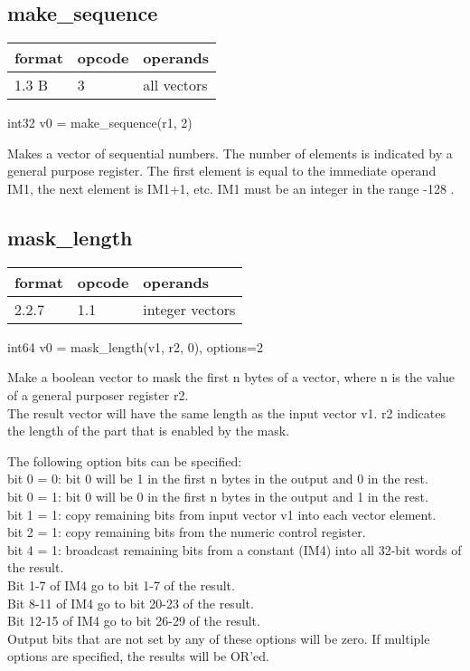 \documentclass[forwardcom.tex]{subfiles}
\begin{document}
\subsection{make\_sequence}
\label{table:makeSequenceInstruction}
\begin{tabular}{|p{12mm}|p{15mm}|p{100mm}|}
\hline
\bfseries format & \bfseries opcode & \bfseries operands \\ \hline
1.3 B &  3 & all vectors \\ \hline
\end{tabular}
\vv

int32 v0 = make\_sequence(r1, 2)
\vv

Makes a vector of sequential numbers. The number of elements is indicated by a general purpose register. 
The first element is equal to the immediate operand IM1, the next element is IM1+1, etc. IM1 must be an integer in the range -128 .
\vv


\subsection{mask\_length}
\label{table:maskLengthInstruction}
\begin{tabular}{|p{12mm}|p{15mm}|p{100mm}|}
\hline
\bfseries format & \bfseries opcode & \bfseries operands \\ \hline
2.2.7 & 1.1 & integer vectors \\ \hline
\end{tabular}
\vv

int64 v0 = mask\_length(v1, r2, 0), options=2
\vv

Make a boolean vector to mask the first n bytes of a vector, where n is the value of a general purposer register r2. \\
The result vector will have the same length as the input vector v1. r2 indicates the length of the part that is enabled by the mask. 
\vv

The following option bits can be specified: \\
bit 0 = 0: bit 0 will be 1 in the first n bytes in the output and 0 in the rest. \\
bit 0 = 1: bit 0 will be 0 in the first n bytes in the output and 1 in the rest. \\
bit 1 = 1: copy remaining bits from input vector v1 into each vector element. \\
bit 2 = 1: copy remaining bits from the numeric control register. \\
bit 4 = 1: broadcast remaining bits from a constant (IM4) into all 32-bit words of the result. \\
\hspace{17mm} Bit 1-7 of IM4 go to bit 1-7 of the result. \\
\hspace{17mm} Bit 8-11 of IM4 go to bit 20-23 of the result. \\
\hspace{17mm} Bit 12-15 of IM4 go to bit 26-29 of the result. \\
Output bits that are not set by any of these options will be zero. 
If multiple options are specified, the results will be OR'ed.
\end{document}
